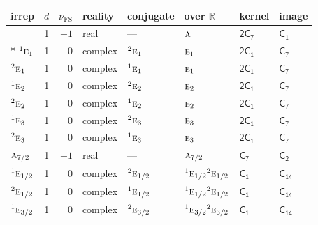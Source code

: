 \documentclass[10pt,a4paper]{article}
\makeatletter
\def\grouprule#1#2{\noalign{\marks\LTgroupmarks{\the\belowrulesep}\nobreak\vskip#1%
  \vskip\aboverulesep}\multispan\LT@cols\unskip{\leaders\hrule\@height#2\hfill\kern\z@}\cr
  \noalign{\penalty\LTrulebreak\vskip\belowrulesep\global\@lastruleclass\z@}}
\numberwithin{equation}{section}
\newcommand{\grp}[1]{\mathsf{#1}}
\newcommand{\irr}[1]{\text{\normalfont\scshape #1}}
\newcommand{\conjpair}[1]{{}^{#1}}
\newcommand{\detbox}[1]{{\setlength{\fboxsep}{1pt}\fbox{#1}}}
\newcommand{\fsind}{\nu_{\mathrm{FS}}}
\makeatother
\begin{document}
{\small\renewcommand{\arraystretch}{1.25}\setlength{\tabcolsep}{4pt}\begin{longtable}{@{}lrrlllll@{}}\toprule
irrep & $d$ & $\fsind$ & reality & conjugate & over $\mathbb{R}$ & kernel & image\\\midrule\endhead
\bottomrule\endfoot\endlastfoot
\detbox{$\irr{a}$} & 1 & $+1$ & real & --- & $\irr{a}$ & \href{2C7.pdf}{$\grp{2C_{7}}$} & \href{../../../rotation/data/pdf/C1.pdf}{$\grp{C_{1}}$}\\*
$\conjpair{1}\irr{e}_{1}$ & 1 & $0$ & complex & $\conjpair{2}\irr{e}_{1}$ & $\irr{e}_{1}$ & \href{2C1.pdf}{$\grp{2C_{1}}$} & \href{../../../rotation/data/pdf/C7.pdf}{$\grp{C_{7}}$}\\
$\conjpair{2}\irr{e}_{1}$ & 1 & $0$ & complex & $\conjpair{1}\irr{e}_{1}$ & $\irr{e}_{1}$ & \href{2C1.pdf}{$\grp{2C_{1}}$} & \href{../../../rotation/data/pdf/C7.pdf}{$\grp{C_{7}}$}\\
$\conjpair{1}\irr{e}_{2}$ & 1 & $0$ & complex & $\conjpair{2}\irr{e}_{2}$ & $\irr{e}_{2}$ & \href{2C1.pdf}{$\grp{2C_{1}}$} & \href{../../../rotation/data/pdf/C7.pdf}{$\grp{C_{7}}$}\\
$\conjpair{2}\irr{e}_{2}$ & 1 & $0$ & complex & $\conjpair{1}\irr{e}_{2}$ & $\irr{e}_{2}$ & \href{2C1.pdf}{$\grp{2C_{1}}$} & \href{../../../rotation/data/pdf/C7.pdf}{$\grp{C_{7}}$}\\
$\conjpair{1}\irr{e}_{3}$ & 1 & $0$ & complex & $\conjpair{2}\irr{e}_{3}$ & $\irr{e}_{3}$ & \href{2C1.pdf}{$\grp{2C_{1}}$} & \href{../../../rotation/data/pdf/C7.pdf}{$\grp{C_{7}}$}\\
$\conjpair{2}\irr{e}_{3}$ & 1 & $0$ & complex & $\conjpair{1}\irr{e}_{3}$ & $\irr{e}_{3}$ & \href{2C1.pdf}{$\grp{2C_{1}}$} & \href{../../../rotation/data/pdf/C7.pdf}{$\grp{C_{7}}$}\\
\grouprule{0pt}{\lightrulewidth}
$\irr{a}_{7/2}$ & 1 & $+1$ & real & --- & $\irr{a}_{7/2}$ & \href{C7.pdf}{$\grp{C_{7}}$} & \href{../../../rotation/data/pdf/C2.pdf}{$\grp{C_{2}}$}\\
$\conjpair{1}\irr{e}_{1/2}$ & 1 & $0$ & complex & $\conjpair{2}\irr{e}_{1/2}$ & $\conjpair{1}\irr{e}_{1/2}\conjpair{2}\irr{e}_{1/2}$ & \href{C1.pdf}{$\grp{C_{1}}$} & $\grp{C_{14}}$\\
$\conjpair{2}\irr{e}_{1/2}$ & 1 & $0$ & complex & $\conjpair{1}\irr{e}_{1/2}$ & $\conjpair{1}\irr{e}_{1/2}\conjpair{2}\irr{e}_{1/2}$ & \href{C1.pdf}{$\grp{C_{1}}$} & $\grp{C_{14}}$\\
$\conjpair{1}\irr{e}_{3/2}$ & 1 & $0$ & complex & $\conjpair{2}\irr{e}_{3/2}$ & $\conjpair{1}\irr{e}_{3/2}\conjpair{2}\irr{e}_{3/2}$ & \href{C1.pdf}{$\grp{C_{1}}$} & $\grp{C_{14}}$\\

\end{longtable}}
\end{document}
